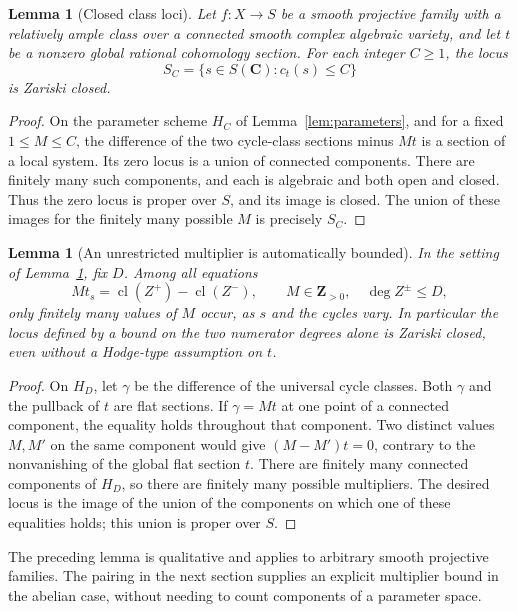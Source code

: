 \documentclass[11pt]{article}
\newtheorem{lemma}[theorem]{Lemma}
\theoremstyle{definition}
\theoremstyle{remark}
\newcommand{\Z}{\mathbf Z}
\newcommand{\C}{\mathbf C}
\newcommand{\cl}{\operatorname{cl}}
\begin{document}
\begin{lemma}[Closed class loci]\label{lem:closed}
Let $f:X\to S$ be a smooth projective family with a relatively ample class over a connected smooth complex algebraic variety, and let $t$ be a nonzero global rational cohomology section. For each integer $C\geq1$, the locus
\[
 S_C=\{s\in S(\C):c_t(s)\leq C\}
\]
is Zariski closed.
\end{lemma}

\begin{proof}
On the parameter scheme $H_C$ of Lemma~\ref{lem:parameters}, and for a fixed $1\leq M\leq C$, the difference of the two cycle-class sections minus $Mt$ is a section of a local system. Its zero locus is a union of connected components. There are finitely many such components, and each is algebraic and both open and closed. Thus the zero locus is proper over $S$, and its image is closed. The union of these images for the finitely many possible $M$ is precisely $S_C$.
\end{proof}

\begin{lemma}[An unrestricted multiplier is automatically bounded]\label{lem:components-multiplier}
In the setting of Lemma~\ref{lem:closed}, fix $D$. Among all equations
\[
 Mt_s=\cl(Z^+)-\cl(Z^-),\qquad
 M\in\Z_{>0},\quad \deg Z^\pm\leq D,
\]
only finitely many values of $M$ occur, as $s$ and the cycles vary. In particular the locus defined by a bound on the two numerator degrees alone is Zariski closed, even without a Hodge-type assumption on $t$.
\end{lemma}

\begin{proof}
On $H_D$, let $\gamma$ be the difference of the universal cycle classes. Both $\gamma$ and the pullback of $t$ are flat sections. If $\gamma=Mt$ at one point of a connected component, the equality holds throughout that component. Two distinct values $M,M'$ on the same component would give $(M-M')t=0$, contrary to the nonvanishing of the global flat section $t$. There are finitely many connected components of $H_D$, so there are finitely many possible multipliers. The desired locus is the image of the union of the components on which one of these equalities holds; this union is proper over $S$.
\end{proof}

The preceding lemma is qualitative and applies to arbitrary smooth projective families. The pairing in the next section supplies an explicit multiplier bound in the abelian case, without needing to count components of a parameter space.
\end{document}
